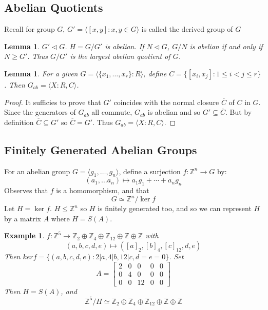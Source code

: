 \documentclass[a4paper,10pt]{article}
\newcommand{\ZZ}{\mathbb{Z}}
\newtheorem{eg}[thm]{Example}
\newtheorem{Lem}[thm]{Lemma}
\begin{document}
\subsection{Abelian Quotients}

Recall for group $G$, $G' = \langle [x,y] : x,y \in G \rangle$ is called the derived group of $G$
\begin{Lem}
$G' \triangleleft G$. $H = G / G'$ is abelian. If $N \triangleleft G$, $G / N$ is abelian if and only if $N \geq G'$. Thus $G / G'$ is the largest abelian quotient of $G$.  
\end{Lem}

\begin{Lem}
For a given $G = \langle \{x_1,\dots, x_r\} : R \rangle$, define $C = \{ [ x_i, x_j ] : 1 \leq i < j \leq r \}$. Then $G_{ab} = \langle X : R, C \rangle$. 
\end{Lem}

\begin{proof}
It sufficies to prove that $G'$ coincides with the normal closure $\overline{C}$ of $C$ in $G$. Since the generators of $G_{ab}$ all commute, $G_{ab}$ is abelian and so $G' \subseteq \overline{C}$. But by definition $\overline{C} \subseteq G'$ so $\overline{C} = G'$. Thus $G_{ab} = \langle X : R,C \rangle$.  
\end{proof}

\subsection{Finitely Generated Abelian Groups}
For an abelian group $G = \langle g_1, \dots, g_n\rangle$, define a surjection $f : \ZZ^n \rightarrow G$ by:
\[ (a_1, \dots a_n) \mapsto a_1 g_1 + \cdots + a_n g_n \]
Observes that $f$ is a homomorphism, and that
\[ G \simeq \ZZ^n / \ker f \]
Let $H = \ker f$. $H \leq \ZZ^n$ so $H$ is finitely generated too, and so we can represent $H$ by a matrix $A$ where $H = S(A)$. 

\begin{eg}
$f: \ZZ^5 \rightarrow \ZZ_2 \oplus \ZZ_4 \oplus \ZZ_{12} \oplus \ZZ \oplus \ZZ$ with 
\[ (a,b,c,d,e) \mapsto ([a]_2, [b]_4, [c]_{12}, d, e) \]
Then $ker f = \{ (a,b,c,d,e): 2 | a, 4 | b, 12 | c, d = e = 0 \}$. Set 
\[ A = \begin{bmatrix}
 2 & 0 & 0 & 0 & 0 \\
 0 & 4 & 0 & 0 & 0 \\
 0 & 0 & 12 & 0 & 0
 \end{bmatrix} \]
Then $H = S(A)$, and
\[ \ZZ^5 / H \simeq \ZZ_2 \oplus \ZZ_4 \oplus \ZZ_{12} \oplus \ZZ \oplus \ZZ \]
\end{eg}
\end{document}
